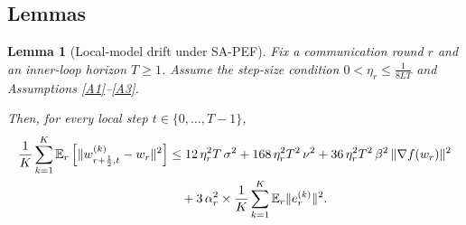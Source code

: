 \documentclass{article} %
\newcommand{\E}{\mathbb{E}}
\newtheorem{lemma}{Lemma}
\begin{document}
\subsection{Lemmas}

\begin{lemma}[Local-model drift under SA-PEF]      \label{lem:local-drift}
Fix a communication round \(r\) and an inner-loop horizon \(T\ge 1\).
Assume the step-size condition \(0 < \eta_r \le \frac{1}{8LT}\) and Assumptions \ref{A1}--\ref{A3}.

Then, for every local step \(t\in\{0,\dots,T-1\}\),
\begin{align}
\frac{1}{K} \sum_{k=1}^{K}
\mathbb{E}_r \left[
  \|w_{r+\frac12,t}^{(k)} - w_r\|^2
\right]
&\le
12\,\eta_r^{2}T\,\sigma^{2}
+168\,\eta_r^{2}T^{2}\,\nu^{2}
+36\,\eta_r^{2}T^{2}\,\beta^{2}\,\|\nabla f(w_r)\|^{2}\notag\\
&\quad
+3\,\alpha_r^{2}\times \frac{1}{K}\sum_{k=1}^{K}\E_r\|e_r^{(k)}\|^{2}.
\end{align}

\end{lemma}
\end{document}

